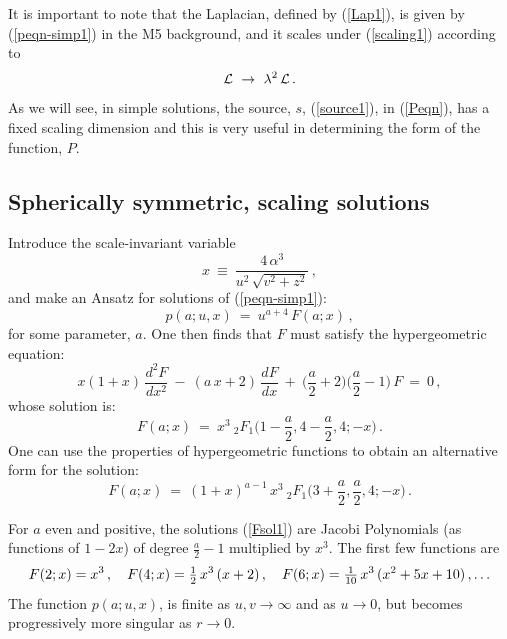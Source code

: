 \documentclass[11pt]{article}
\def\coeff#1#2{\relax{\textstyle \frac{#1}{#2}}\displaystyle}
\numberwithin{equation}{section}
\begin{document}
It is important to note that the Laplacian, defined by (\ref{Lap1}),  is given by  (\ref{peqn-simp1})  in the M5 background,  and it scales under (\ref{scaling1}) according to 
%
\begin{equation}
{\cal L} ~\to~  \lambda^{2}\, \cal L  \,.
 \label{scaling2}
\end{equation}
%
As we will see, in simple solutions, the source, $s$,  (\ref{source1}), in  (\ref{Peqn}),  has a fixed scaling dimension and this is very useful in determining the form  of the function, $P$.

\subsection{Spherically symmetric, scaling solutions}
\label{ss:simpsol2}


Introduce the scale-invariant variable 
%
\begin{equation}
x  ~\equiv~   \frac{4\, \alpha^3}{u^2 \, \sqrt{v^2 +z^2} }\,, 
\label{xdefn}
\end{equation}
%
and make an Ansatz for solutions of (\ref{peqn-simp1}):
%
\begin{equation}
p(a;u, x)  ~=~ u^{a + 4} \,  F(a;x)   \,, 
\label{pAnsatz1}
\end{equation}
%
for some parameter, $a$.  One then finds that $F$ must satisfy the hypergeometric equation: 
%
\begin{equation}
x(1+x) \, \frac{d^2F}{dx^2}   ~-~ (a\,x +2) \, \frac{dF}{dx} ~+~ \bigg( \frac{a}{2}+2 \bigg) \bigg( \frac{a}{2} -1\bigg)  \, F~=~ 0 \,,
\label{Feqn}
\end{equation}
%
whose solution is:
%
\begin{equation}
F(a;x)     ~=~ x^3 \ {}_{2} F_1 \bigg(1- \frac{a}{2} , 4- \frac{a}{2}  , 4; -x \bigg)\,.
\label{Fsol1}
\end{equation}
%
One can use the properties of hypergeometric functions to obtain an alternative form for the solution: 
%
\begin{equation}
F(a;x)     ~=~(1+x)^{a-1}\,  x^3 \  {}_{2} F_1 \bigg(3+ \frac{a}{2} , \frac{a}{2}  , 4; -x \bigg)\,.
\label{Fsol2}
\end{equation}
%

For $a$ even and positive, the solutions (\ref{Fsol1}) are   Jacobi Polynomials (as functions of $1-2x$) of degree $\frac{a}{2} -1$ multiplied by  $x^3$.  The first few functions are
%
\begin{equation}
\begin{aligned}
F(2;x)  =  x^3  \,, \quad  F(4;x)    = \coeff{1}{2} \,  x^3 \,(x+2) \,, \quad F(6;x)    =\coeff{1}{10} \,  x^3 \, (x^2+5 x +10)  \,,   \dots 
\end{aligned}
\label{psol1}
\end{equation}
%
The function $p(a;u, x)$, is  finite as $u,v \to \infty$ and as $ u \to 0$, but becomes progressively more singular as $r \to 0$.
\end{document}
